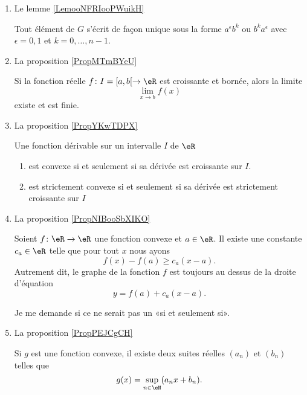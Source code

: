 \begin{enumerate}
\item Le lemme \ref{LemooNFRIooPWuikH}
\begin{lemma}
    Tout élément de \( G\) s'écrit de façon unique sous la forme \( a^{\epsilon}b^k\) ou \( b^ka^{\epsilon}\) avec \( \epsilon=0,1\) et \( k=0,\ldots, n-1\).
\end{lemma}

\item La proposition \ref{PropMTmBYeU}


\begin{proposition}
    Si la fonction réelle \( f\colon I=\mathopen[ a , b [\to \eR\) est croissante et bornée, alors la limite
    \begin{equation}
        \lim_{x\to b} f(x)
    \end{equation}
    existe et est finie.
\end{proposition}

\item La proposition \ref{PropYKwTDPX}

\begin{proposition}
    Une fonction dérivable sur un intervalle \( I\) de \( \eR\) 
    \begin{enumerate}
        \item
            est convexe si et seulement si sa dérivée est croissante sur \( I\).
        \item
            est strictement convexe si et seulement si sa dérivée est strictement croissante sur \( I\)
    \end{enumerate}
\end{proposition}

\item La proposition \ref{PropNIBooSbXIKO}

\begin{proposition}
    Soient \( f\colon \eR\to \eR \) une fonction convexe et \( a\in \eR\). Il existe une constante \( c_a\in \eR\) telle que pour tout \( x\) nous ayons
    \begin{equation}
        f(x)-f(a)\geq c_a(x-a).
    \end{equation}
    Autrement dit, le graphe de la fonction \( f\) est toujours au dessus de la droite d'équation
    \begin{equation}
        y=f(a)+c_a(x-a).
    \end{equation}
\end{proposition}

Je me demande si ce ne serait pas un «si et seulement si».
\item La proposition \ref{PropPEJCgCH}
\begin{proposition}
    Si \( g\) est une fonction convexe, il existe deux suites réelles \( (a_n)\) et \( (b_n)\) telles que
    \begin{equation}
        g(x)=\sup_{n\in \eN}(a_nx+b_n).
    \end{equation}
\end{proposition}


\end{enumerate}
